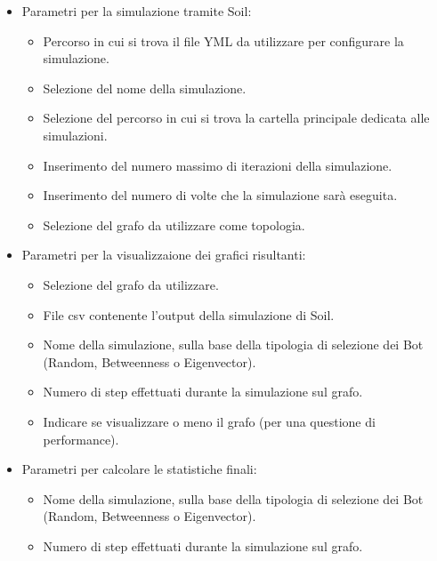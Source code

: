 \begin{itemize}
            \item Parametri per la simulazione tramite Soil:
              \begin{itemize}
                \item Percorso in cui si trova il file YML da utilizzare per configurare la simulazione.
                \item Selezione del nome della simulazione.
                \item Selezione del percorso in cui si trova la cartella principale dedicata alle simulazioni.
                \item Inserimento del numero massimo di iterazioni della simulazione.
                \item Inserimento del numero di volte che la simulazione sarà eseguita.
                \item Selezione del grafo da utilizzare come topologia.
              \end{itemize}
              
            \item Parametri per la visualizzaione dei grafici  risultanti:
              \begin{itemize}
                \item Selezione del grafo da utilizzare.
                \item File csv contenente l’output della simulazione di Soil.
                \item Nome della simulazione, sulla base della tipologia di selezione dei Bot (Random, Betweenness o Eigenvector).
                \item Numero di step effettuati durante la simulazione sul grafo.
                \item Indicare se visualizzare o meno il grafo (per una questione di performance).
              \end{itemize}
              
            \item Parametri per calcolare le statistiche finali:
              \begin{itemize}
                \item Nome della simulazione, sulla base della tipologia di selezione dei Bot (Random, Betweenness o Eigenvector).
                \item Numero di step effettuati durante la simulazione sul grafo.
              \end{itemize}
          \end{itemize}